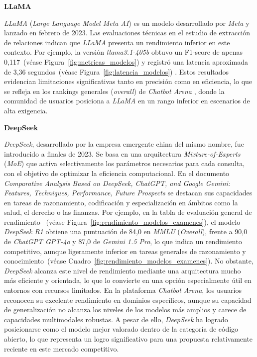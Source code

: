 \vspace{0.4cm}
\noindent\textbf{LLaMA}

\textit{LLaMA} (\textit{Large Language Model Meta AI}) es un modelo desarrollado por \textit{Meta} y lanzado en febrero de 2023. Las evaluaciones técnicas en el estudio de extracción de relaciones indican que \textit{LLaMA} presenta un rendimiento inferior en este contexto. Por ejemplo, la versión \textit{llama3.1-405b} obtuvo un F1-score de apenas 0,117~(véase Figura~\ref{fig:metricas_modelos}) y registró una latencia aproximada de 3,36 segundos~(véase Figura~\ref{fig:latencia_modelos}) . Estos resultados evidencian limitaciones significativas tanto en precisión como en eficiencia, lo que se refleja en los rankings generales (\textit{overall}) de \textit{Chatbot Arena} \cite{ref44}, donde la comunidad de usuarios posiciona a \textit{LLaMA} en un rango inferior en escenarios de alta exigencia.

\newpage
\noindent\textbf{DeepSeek}

\textit{DeepSeek}, desarrollado por la empresa emergente china del mismo nombre, fue introducido a finales de 2023. Se basa en una arquitectura \textit{Mixture-of-Experts} (\textit{MoE}) \cite{ref43} que activa selectivamente los parámetros necesarios para cada consulta, con el objetivo de optimizar la eficiencia computacional. En el documento \textit{Comparative Analysis Based on DeepSeek, ChatGPT, and Google Gemini: Features, Techniques, Performance, Future Prospects} \cite{ref16} se destacan sus capacidades en tareas de razonamiento, codificación y especialización en ámbitos como la salud, el derecho o las finanzas. Por ejemplo, en la tabla de evaluación general de rendimiento ~(véase Figura~\ref{fig:rendimiento_modelos_examenes}), el modelo \textit{DeepSeek R1} obtiene una puntuación de 84,0 en \textit{MMLU} (\textit{Overall}), frente a 90,0 de \textit{ChatGPT GPT-4o} y 87,0 de \textit{Gemini 1.5 Pro}, lo que indica un rendimiento competitivo, aunque ligeramente inferior en tareas generales de razonamiento y conocimiento~(véase Cuadro~\ref{fig:rendimiento_modelos_examenes}).
No obstante, \textit{DeepSeek} alcanza este nivel de rendimiento mediante una arquitectura mucho más eficiente y orientada, lo que lo convierte en una opción especialmente útil en entornos con recursos limitados. En la plataforma \textit{Chatbot Arena}, los usuarios reconocen su excelente rendimiento en dominios específicos, aunque su capacidad de generalización no alcanza los niveles de los modelos más amplios y carece de capacidades multimodales robustas. A pesar de ello, \textit{DeepSeek} ha logrado posicionarse como el modelo mejor valorado dentro de la categoría de código abierto, lo que representa un logro significativo para una propuesta relativamente reciente en este mercado competitivo.

